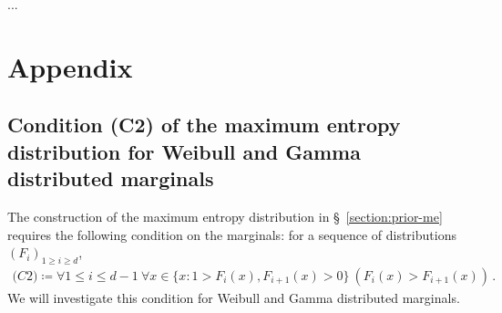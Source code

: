 \documentclass{article}
\begin{document}
%
...
%
\section{Appendix}
%

%
\subsection{Condition (C2) of the maximum entropy distribution
	for Weibull and Gamma distributed marginals}
\label{section:C2}
%
The construction of the maximum entropy distribution in
\S~\ref{section:prior-me} requires the following condition on the marginals:
for a sequence of distributions $(F_i)_{1 \geq i \geq d}$,
%
\begin{align*}
	\textit{(C2)} \coloneqq \forall 1 \leq i \leq d - 1
		\ \forall x \in \{x \colon 1 > F_i(x), F_{i + 1}(x) > 0\}
		\ (F_i(x) > F_{i + 1}(x))\,.
\end{align*}
%
We will investigate this condition for Weibull and Gamma distributed marginals.
%
\end{document}
